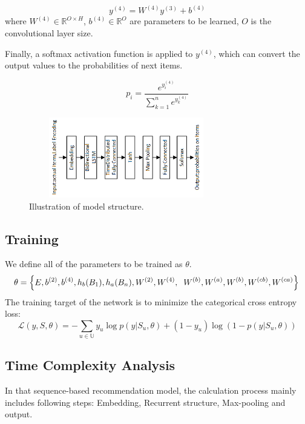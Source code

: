 \documentclass[runningheads]{llncs}
\begin{document}
\begin{equation}
y^{(4)}=W^{(4)}y^{(3)}+b^{(4)}
\end{equation}
where $W^{(4)}\in \mathbb{R}^{O\times H}$, $b^{(4)}\in \mathbb{R}^{O}$ are parameters to be learned, $O$ is the convolutional layer size.

Finally, a softmax activation function is applied to $y^{(4)}$, which can convert the output values to the probabilities of next items. 

\begin{equation}
p_{i}= \frac{e^{y_{i}^{(4)}}}{\sum_{k=1}^{n}e^{y_{k}^{(4)}}}
\end{equation}

\begin{figure}[htbp]
\centerline{\includegraphics[width=8.5cm,height=3.5cm]{model.png}}
\caption{Illustration of model structure.}
\label{fig}
\end{figure}
\subsection{Training}

We define all of the parameters to be trained as $\theta $.
\begin{equation}
\theta=  \left \{ E,b^{(2)},b^{(4)},h_{b}(B_{1}),h_{a}(B_{n}),W^{(2)}, W^{(4)},\right.\\
\left.W^{(b)},W^{(a)},W^{(b)},W^{(cb)},W^{(ca)} \right \} \\
\end{equation}
The training target of the network is to minimize the categorical cross entropy loss:
\begin{equation}
\mathcal{L}(y,S,\theta )=-\sum_{u\in \mathbb{U}}y_{u}\log p(y|S_{u},\theta)+(1-y_{u})\log (1-p(y|S_{u},\theta ))
\end{equation}
\subsection{Time Complexity Analysis}

In that sequence-based recommendation model, the calculation process mainly includes following steps: Embedding, Recurrent structure, Max-pooling and output.
\end{document}
